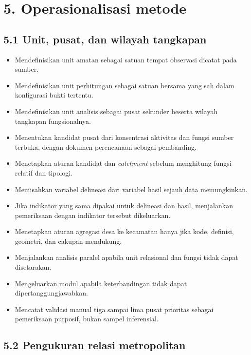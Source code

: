 \documentclass[
  indonesian,
  11pt,
]{article}
\providecommand{\tightlist}{%
  \setlength{\itemsep}{0pt}\setlength{\parskip}{0pt}}
\renewcommand{\tightlist}{%
  \setlength{\itemsep}{0.22em}%
  \setlength{\parskip}{0pt}%
}
\begin{document}
\section{5. Operasionalisasi metode}\label{operasionalisasi-metode}

\subsection{5.1 Unit, pusat, dan wilayah
tangkapan}\label{unit-pusat-dan-wilayah-tangkapan}

\begin{itemize}
\tightlist
\item[$\square$]
  Mendefinisikan unit amatan sebagai satuan tempat observasi dicatat
  pada sumber.
\item[$\square$]
  Mendefinisikan unit perhitungan sebagai satuan bersama yang sah dalam
  konfigurasi bukti tertentu.
\item[$\square$]
  Mendefinisikan unit analisis sebagai pusat sekunder beserta wilayah
  tangkapan fungsionalnya.
\item[$\square$]
  Menentukan kandidat pusat dari konsentrasi aktivitas dan fungsi sumber
  terbuka, dengan dokumen perencanaan sebagai pembanding.
\item[$\square$]
  Menetapkan aturan kandidat dan \emph{catchment} sebelum menghitung
  fungsi relatif dan tipologi.
\item[$\square$]
  Memisahkan variabel delineasi dari variabel hasil sejauh data
  memungkinkan.
\item[$\square$]
  Jika indikator yang sama dipakai untuk delineasi dan hasil,
  menjalankan pemeriksaan dengan indikator tersebut dikeluarkan.
\item[$\square$]
  Menetapkan aturan agregasi desa ke kecamatan hanya jika kode,
  definisi, geometri, dan cakupan mendukung.
\item[$\square$]
  Menjalankan analisis paralel apabila unit relasional dan fungsi tidak
  dapat disetarakan.
\item[$\square$]
  Mengeluarkan modul apabila keterbandingan tidak dapat
  dipertanggungjawabkan.
\item[$\square$]
  Mencatat validasi manual tiga sampai lima pusat prioritas sebagai
  pemeriksaan purposif, bukan sampel inferensial.
\end{itemize}

\subsection{5.2 Pengukuran relasi
metropolitan}\label{pengukuran-relasi-metropolitan}
\end{document}
